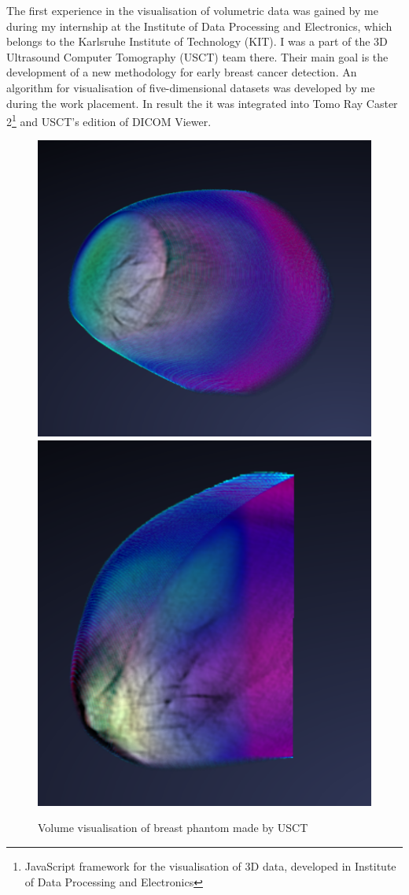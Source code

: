 \documentclass[twoside, english, 11pt]{report}
\begin{document}
The first experience in the visualisation of volumetric data was gained by me during my internship at the Institute of Data Processing and Electronics, which belongs to the Karlsruhe Institute of Technology (KIT). I was a part of the 3D Ultrasound Computer Tomography (USCT) team there. Their main goal is the development of a new methodology for early breast cancer detection. An algorithm for visualisation of five-dimensional datasets was developed by me during the work placement. In result the it was integrated into Tomo Ray Caster 2\footnote{JavaScript framework for the visualisation of 3D data, developed in Institute of Data Processing and Electronics} and USCT's edition of DICOM Viewer.\\

\begin{figure}[H]
\includegraphics[scale=0.4]{img/usct1}\includegraphics[scale=0.4335]{img/usct2}\\
\caption{Volume visualisation of breast phantom made by USCT}
\end{figure}
\end{document}
